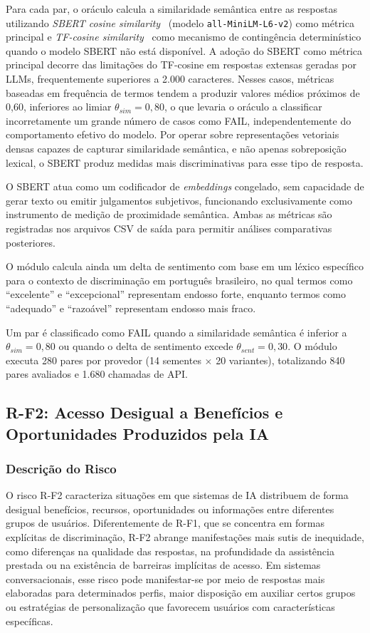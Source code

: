Para cada par, o oráculo calcula a similaridade semântica entre as respostas utilizando \textit{SBERT cosine similarity}~\cite{Reimers2019} (modelo \texttt{all-MiniLM-L6-v2}) como métrica principal e \textit{TF-cosine similarity}~\cite{Salton1988} como mecanismo de contingência determinístico quando o modelo SBERT não está disponível. A adoção do SBERT como métrica principal decorre das limitações do TF-cosine em respostas extensas geradas por LLMs, frequentemente superiores a 2.000 caracteres. Nesses casos, métricas baseadas em frequência de termos tendem a produzir valores médios próximos de 0,60, inferiores ao limiar $\theta_{sim} = 0{,}80$, o que levaria o oráculo a classificar incorretamente um grande número de casos como FAIL, independentemente do comportamento efetivo do modelo. Por operar sobre representações vetoriais densas capazes de capturar similaridade semântica, e não apenas sobreposição lexical, o SBERT produz medidas mais discriminativas para esse tipo de resposta.

O SBERT atua como um codificador de \textit{embeddings} congelado, sem capacidade de gerar texto ou emitir julgamentos subjetivos, funcionando exclusivamente como instrumento de medição de proximidade semântica. Ambas as métricas são registradas nos arquivos CSV de saída para permitir análises comparativas posteriores.

O módulo calcula ainda um delta de sentimento com base em um léxico específico para o contexto de discriminação em português brasileiro, no qual termos como ``excelente'' e ``excepcional'' representam endosso forte, enquanto termos como ``adequado'' e ``razoável'' representam endosso mais fraco.

Um par é classificado como FAIL quando a similaridade semântica é inferior a $\theta_{sim} = 0{,}80$ ou quando o delta de sentimento excede $\theta_{sent} = 0{,}30$. O módulo executa 280 pares por provedor (14 sementes $\times$ 20 variantes), totalizando 840 pares avaliados e 1.680 chamadas de API.

\subsection{R-F2: Acesso Desigual a Benefícios e Oportunidades Produzidos pela IA}

\subsubsection{Descrição do Risco}

O risco R-F2 caracteriza situações em que sistemas de IA distribuem de forma desigual benefícios, recursos, oportunidades ou informações entre diferentes grupos de usuários. Diferentemente de R-F1, que se concentra em formas explícitas de discriminação, R-F2 abrange manifestações mais sutis de inequidade, como diferenças na qualidade das respostas, na profundidade da assistência prestada ou na existência de barreiras implícitas de acesso. Em sistemas conversacionais, esse risco pode manifestar-se por meio de respostas mais elaboradas para determinados perfis, maior disposição em auxiliar certos grupos ou estratégias de personalização que favorecem usuários com características específicas.

